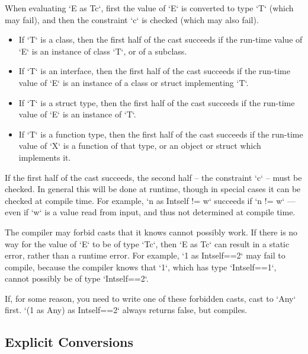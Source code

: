 When evaluating \xcd`E as T{c}`, first the value of \xcd`E` is converted to
type \xcd`T` (which may fail), and then the constraint \xcd`{c}` is checked
(which may also fail). 



\begin{itemize}
      
\item If \xcd`T` is a class, then the first half of the cast succeeds if the
      run-time value of \xcd`E` is an instance of class \xcd`T`, or of a
      subclass. 

\item If \xcd`T` is an interface, then the first half of the cast succeeds if
      the run-time value of \xcd`E` is an instance of a class or struct
      implementing 
      \xcd`T`. 

\item If \xcd`T` is a struct type, then the first half of the cast succeeds if
      the run-time value of \xcd`E` is an instance of \xcd`T`.  

\item If \xcd`T` is a function type, then the first half of the cast succeeds
      if the run-time value of \xcd`X` is a function of that type, or an
      object or struct which implements it.
\end{itemize}

If the first half of the cast succeeds, the second half -- the constraint
\xcd`{c}` -- must be checked.  In general this will be done at runtime, though
in special cases it can be checked at compile time.   For example, 
\xcd`n as Int{self != w}` succeeds if \xcd`n != w` --- even if \xcd`w` is a value
read from input, and thus not determined at compile time.

The compiler may forbid casts that it knows cannot possibly work. If there is
no way for the value of \xcd`E` to be of type \xcd`T{c}`, then 
\xcd`E as T{c}` can result in a static error, rather than a runtime error.  
For example, \xcd`1 as Int{self==2}` may fail to compile, because the compiler
knows that \xcd`1`, which has type \xcd`Int{self==1}`, cannot possibly be of
type \xcd`Int{self==2}`. 

If, for some reason, you need to write one of these forbidden casts, cast to
\xcd`Any` first.  \xcd`(1 as Any) as Int{self==2}` always returns false, but
compiles.

\subsection{Explicit Conversions}

